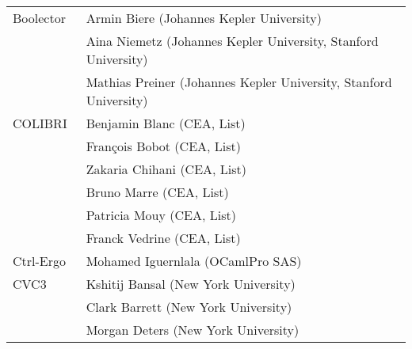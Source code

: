 {\begin{table}
{\begin{tabular}{ll}
      Boolector~\cite{DBLP:conf/cav/NiemetzPWB18}
      & Armin Biere (Johannes Kepler University) \\
      & Aina Niemetz (Johannes Kepler University, Stanford University) \\
      & Mathias Preiner (Johannes Kepler University, Stanford University)
      \\ \midrule

      COLIBRI~\cite{colibri}
      & Benjamin Blanc (CEA, List) \\
      & Fran\c{c}ois Bobot (CEA, List) \\
      & Zakaria Chihani (CEA, List) \\
      & Bruno Marre (CEA, List) \\
      & Patricia Mouy (CEA, List) \\
      & Franck Vedrine (CEA, List)
      \\ \midrule

      Ctrl-Ergo~\cite{DBLP:conf/cade/BobotCCIMMM12}
      & Mohamed Iguernlala (OCamlPro SAS)
      \\ \midrule

      CVC3~\cite{DBLP:conf/cav/BarrettT07}
      & Kshitij Bansal (New York University) \\
      & Clark Barrett (New York University) \\
      & Morgan Deters (New York University)
      \\ \bottomrule
    \end{tabular}
    }
  \end{table}


}
